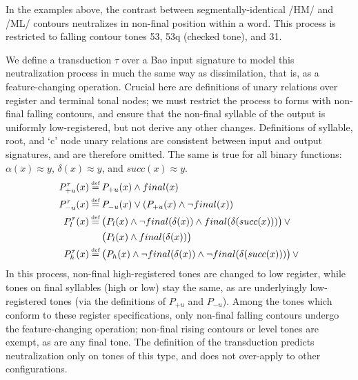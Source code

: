 \documentclass{article}
\newcommand\myeq{\mathrel{\stackrel{\makebox[0pt]{\mbox{\normalfont\tiny def}}}{=}}}
\newcommand{\ap}{\approx}
\begin{document}
In the examples above, the contrast between segmentally-identical /HM/ and /ML/ contours neutralizes in non-final position within a word. This process is restricted to falling contour tones 53, 53q (checked tone), and 31.\par
We define a transduction $\tau$ over a Bao input signature to model this neutralization process in much the same way as dissimilation, that is, as a feature-changing operation. Crucial here are definitions of unary relations over register and terminal tonal nodes; we must restrict the process to forms with non-final falling contours, and ensure that the non-final syllable of the output is uniformly low-registered, but not derive any other changes. Definitions of syllable, root, and `c' node unary relations are consistent between input and output signatures, and are therefore omitted. The same is true for all binary functions: $\alpha(x)\ap y$, $\delta(x)\ap y$, and $succ(x)\ap y$.
\begin{equation}
\begin{aligned}
P^{\tau}_{+u}(x)&\myeq P_{+u}(x)\land final(x)  \\
P^{\tau}_{-u}(x)&\myeq P_{-u}(x) \lor (P_{+u}(x)\land \neg final(x)) \\
P^{\tau}_{l}(x)&\myeq \big(P_{l}(x)\land \neg final(\delta(x))\land final(\delta(succ(x)))\big)\,\lor \\
&\quad\,\,\big(P_{l}(x)\land final(\delta(x))\big) \\
P^{\tau}_{h}(x)&\myeq \big(P_{h}(x)\land\neg final(\delta(x))\land\neg final(\delta(succ(x)))\big)\,\lor \\
\end{aligned}
\end{equation}
In this process, non-final high-registered tones are changed to low register, while tones on final syllables (high or low) stay the same, as are underlyingly low-registered tones (via the definitions of $P_{+u}$ and $P_{-u}$). Among the tones which conform to these register specifications, only non-final falling contours undergo the feature-changing operation; non-final rising contours or level tones are exempt, as are any final tone. The definition of the transduction predicts neutralization only on tones of this type, and does not over-apply to other configurations.
\end{document}

